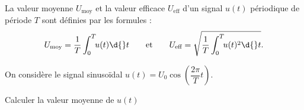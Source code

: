 
\finEntrainement



\medskip



\medskip

La valeur moyenne $U_{\text{moy}}$  et la valeur efficace $U_{\textrm{eff}}$ d'un signal $u(t)$ périodique de période $T$ sont définies par les formules : 
\[
U_{\text{moy}}=\dfrac{1}{T}\int_0^T \!\!u(t)\d{}t
\qquad\text{et}\qquad
U_{\textrm{eff}}=\sqrt{\dfrac{1}{T}\int_0^T \!\!u(t)^2\d{}t}.
\]
\minusMedskip


\hauteurLargeurCadreReponse		{8mm}{5cm}
\initialisationEntrainement

On considère le signal sinusoïdal $u(t)=U_0\cos\left(\dfrac{2\pi}{T}t\right)$.

\debutEntrainement


\begin{enonce}
Calculer la valeur moyenne de $u(t)$
\end{enonce}


